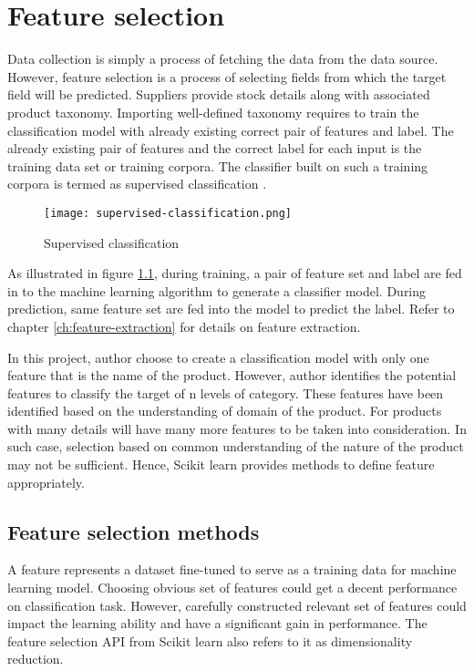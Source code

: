 \chapter{Feature selection}

Data collection is simply a process of fetching the data from the data source. However, feature selection is a process of selecting fields from which the target field will be predicted. Suppliers provide stock details along with associated product taxonomy. Importing well-defined taxonomy requires to train the classification model with already existing correct pair of features and label. The already existing pair of features and the correct label for each input is the training data set or training corpora. The classifier built on such a training corpora is termed as supervised classification \parencite{BirdKleinLoper09}.

\begin{figure}[H]
      \centering    
      \texttt{[image: supervised-classification.png]}
      \caption{Supervised classification \parencite{BirdKleinLoper09}}
      \label{fig:supervised-classification}
  \end{figure}

  As illustrated in figure \ref{fig:supervised-classification}, during training, a pair of feature set and label are fed in to the machine learning algorithm to generate a classifier model. During prediction, same feature set are fed into the model to predict the label. Refer to chapter \ref{ch:feature-extraction} for details on feature extraction.

In this project, author choose to create a classification model with only one feature that is the name of the product. However, author identifies the potential features to classify the target of n levels of category. These features have been identified based on the understanding of domain of the product. For products with many details will have many more features to be taken into consideration. In such case, selection based on common understanding of the nature of the product may not be sufficient. Hence, Scikit learn  \parencite{sklearn_api} provides methods to define feature appropriately. 


\section {Feature selection methods} \label{sec:feature-selection}

A feature represents a dataset fine-tuned to serve as a training data for machine learning model. Choosing obvious set of features could get a decent performance on classification task. However, carefully constructed relevant set of features could impact the learning ability and have a significant gain in performance. The feature selection API from Scikit learn \parencite{sklearn_api} also refers to it as dimensionality reduction. 

